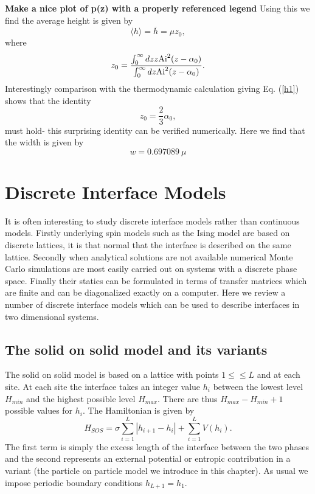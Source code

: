 {\bf Make a nice plot of p(z) with a properly referenced legend}
Using this we find the average height is given by
\begin{equation}
\langle h\rangle = \overline h= \mu z_0,
\end{equation}
where 
\begin{equation}
z_0 = \frac{\int_0^\infty dz z {\rm Ai}^2(z-\alpha_0)}{\int_0^\infty dz {\rm Ai}^2(z-\alpha_0)}.
\end{equation}
Interestingly comparison with the thermodynamic calculation giving Eq. (\ref{h1}) shows that the identity
\begin{equation}
z_0 = \frac{2}{3}\alpha_0,
\end{equation}
must hold- this surprising identity can be verified numerically. Here we find that the width is given by
\begin{equation}
w= 0.697089 \ \mu
\end{equation}
\section{Discrete Interface Models}
It is often interesting to study discrete interface models rather than continuous models. Firstly underlying spin models such as the Ising model are based on discrete lattices, it is that normal
that the interface is described on the same lattice. Secondly when analytical solutions are not available numerical Monte Carlo simulations are most easily carried out on systems with a discrete phase space. Finally their statics can be formulated in terms of transfer matrices which are finite and can be diagonalized exactly on a computer. Here we review a number of discrete interface models which can be used to describe interfaces in two dimensional systems. 
\subsection{The solid on solid model and its variants}
The solid on solid model is based on a lattice with points $1\leq \leq  L$ and at  each site. At each site the interface takes an integer value $h_i$  between the lowest level $H_{min}$ and the highest possible level $H_{max}$. There are thus  $H_{max}-H_{min}+1$ possible values for $h_i$. The Hamiltonian is given by
\begin{equation}
H_{SOS} = \sigma\sum_{i=1}^L |h_{i+1}- h_{i}| + \sum_{i=1}^L V(h_i).
\end{equation}
The first term is simply the excess length of the interface between the two phases and the second represents an external potential or entropic contribution in a variant (the particle on particle model we introduce in this chapter). As usual we impose periodic boundary conditions 
$h_{L+1}=h_1$.


